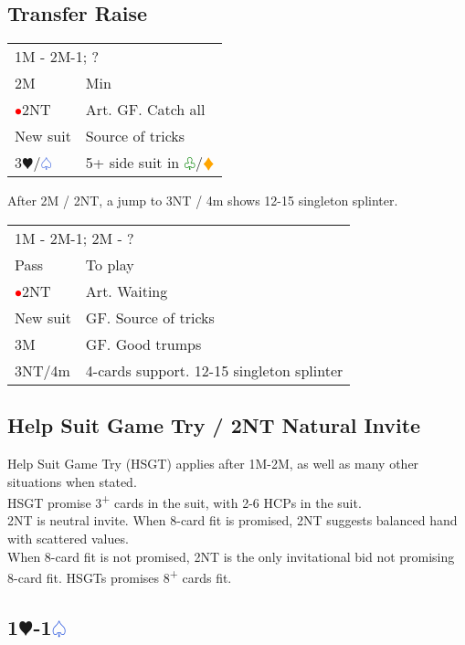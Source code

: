 \documentclass{article}
\renewcommand{\sp}{\textcolor{RoyalBlue}{$\varspade$}}
\newcommand{\he}{\textcolor{RubineRed}{$\varheart$}}
\newcommand{\di}{\textcolor{Orange}{$\vardiamond$}}
\newcommand{\cl}{\textcolor{Green}{$\varclub$}}
\newcommand{\nt}{\relsize{-1}NT\relsize{1}}
\newcommand{\up}{\textsuperscript{+}}
\newcommand{\al}{\textcolor{red}{$\bullet$}}
\begin{document}
\subsection{Transfer Raise}

\begin{tabular}{|l|p{6.5cm}}
	\multicolumn{2}{l}{1M - 2M-1; ? }\\
	2M & Min \\
	\al{}2\nt{} & Art. GF. Catch all \\
	New suit & Source of tricks \\
	3\he{}/\sp{} & 5+ side suit in \cl{}/\di{}
\end{tabular}

\medskip

After 2M / 2\nt{}, a jump to 3\nt{} / 4m shows 12-15 singleton splinter. \\

\begin{tabular}{|l|p{6.5cm}}
	\multicolumn{2}{l}{1M - 2M-1; 2M - ? }\\
	Pass & To play \\
	\al{}2\nt{} & Art. Waiting \\
	New suit & GF. Source of tricks \\
	3M & GF. Good trumps \\
	3\nt{}/4m & 4-cards support. 12-15 singleton splinter \\
\end{tabular}

\subsection{Help Suit Game Try / 2\nt{} Natural Invite}
Help Suit Game Try (HSGT) applies after 1M-2M, as well as many other situations when stated. \\
HSGT promise 3\up{} cards in the suit, with 2-6 HCPs in the suit. \\
2\nt{} is neutral invite. When 8-card fit is promised, 2\nt{} suggests balanced hand with scattered values. \\
When 8-card fit is not promised, 2\nt{} is the only invitational bid not promising 8-card fit. HSGTs promises 8\up{} cards fit. 

\subsection{1\he{}-1\sp{}}
\end{document}
